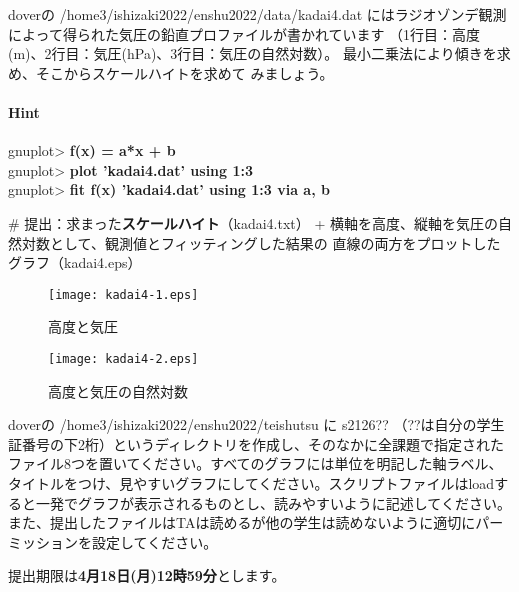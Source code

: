 \documentclass[a4j]{ujarticle} %
\newenvironment{terminal}{%
  \begin{center}
   \begin{minipage}{.8\textwidth}
    \setlength{\FrameSep}{.5\FrameSep}%
    \begin{framed}\ttfamily\small%
     \setlength\baselineskip{.85\baselineskip}%
}{%
    \end{framed}
   \end{minipage}
  \end{center}%
}
\begin{document}
\begin{enumerate}
doverの /home3/ishizaki2022/enshu2022/data/kadai4.dat にはラジオゾンデ観測によって得られた気圧の鉛直プロファイルが書かれています
（1行目：高度(m)、2行目：気圧(hPa)、3行目：気圧の自然対数）。
最小二乗法により傾きを求め、そこからスケールハイトを求めて
みましょう。

\paragraph{Hint}

\begin{terminal}
 gnuplot> {\bf f(x) = a*x + b} \\  
 gnuplot> {\bf plot 'kadai4.dat' using 1:3} \\
 gnuplot> {\bf fit f(x) 'kadai4.dat' using 1:3 via a, b}
\end{terminal}

\# 提出：求まった\textbf{スケールハイト}（kadai4.txt）
     + 横軸を高度、縦軸を気圧の自然対数として、観測値とフィッティングした結果の
     直線の両方をプロットしたグラフ（kadai4.eps）

\newpage
\begin{figure}[h]
 \begin{center}
  \texttt{[image: kadai4-1.eps]}
  \caption{高度と気圧}
 \end{center}
\end{figure}

\begin{figure}[h]
 \begin{center}
  \texttt{[image: kadai4-2.eps]}
  \caption{高度と気圧の自然対数}
 \end{center}
\end{figure}

\end{enumerate}
doverの /home3/ishizaki2022/enshu2022/teishutsu に s2126?? （??は自分の学生証番号の下2桁）というディレクトリを作成し、そのなかに全課題で指定されたファイル8つを置いてください。すべてのグラフには単位を明記した軸ラベル、タイトルをつけ、見やすいグラフにしてください。スクリプトファイルはloadすると一発でグラフが表示されるものとし、読みやすいように記述してください。また、提出したファイルはTAは読めるが他の学生は読めないように適切にパーミッションを設定してください。

提出期限は\textbf{4月18日(月)12時59分}とします。
\end{document}
